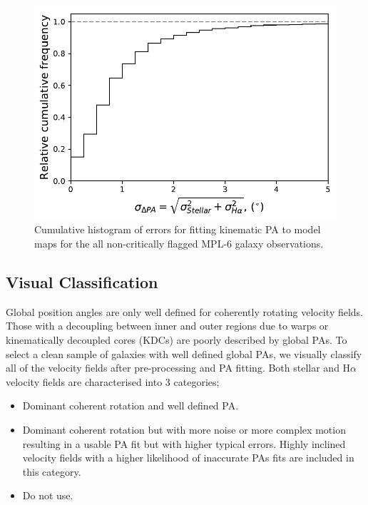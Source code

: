 \begin{figure}
    \centering
	\includegraphics[width=0.6\linewidth]{thesis/latex/misalignment_intro/cumulative_model_errors.pdf}
    \caption{Cumulative histogram of errors for fitting kinematic PA to model maps for the all non-critically flagged MPL-6 galaxy observations.}
    \label{fig:model_errors}
\end{figure}

\subsection{Visual Classification}
Global position angles are only well defined for coherently rotating velocity fields. Those with a decoupling between inner and outer regions due to warps or kinematically decoupled cores (KDCs) are poorly described by global PAs. To select a clean sample of galaxies with well defined global PAs, we visually classify all of the velocity fields after pre-processing and PA fitting. Both stellar and H$\alpha$ velocity fields are characterised into 3 categories;
\begin{itemize}
    \item Dominant coherent rotation and well defined PA.
    \item Dominant coherent rotation but with more noise or more complex motion resulting in a usable PA fit but with higher typical errors. Highly inclined velocity fields with a higher likelihood of inaccurate PAs fits are included in this category. 
    \item Do not use.
\end{itemize}

